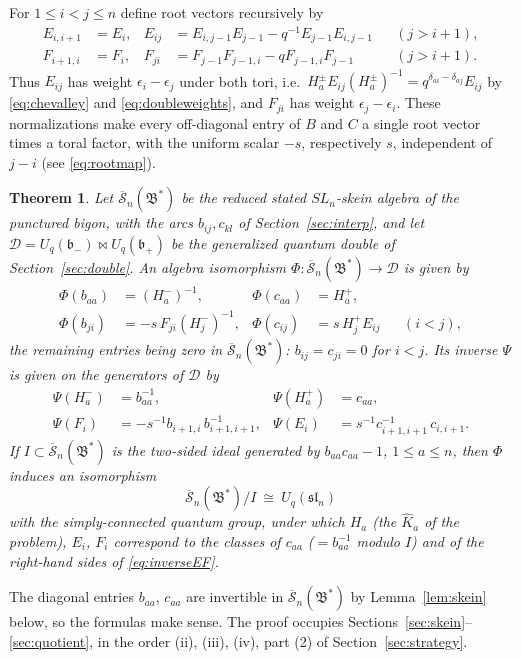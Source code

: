 \documentclass[11pt]{article}
\newtheorem{theorem}{Theorem}[section]
\theoremstyle{remark}
\newcommand{\U}{U_q}
\newcommand{\slN}{\mathfrak{sl}_n}
\newcommand{\bp}{\mathfrak b_+}
\newcommand{\bm}{\mathfrak b_-}
\newcommand{\redS}{\overline{\mathcal S}_n}
\newcommand{\Bstar}{\mathfrak B^*}
\newcommand{\cD}{\mathcal D}
\begin{document}
For $1\le i<j\le n$ define root vectors recursively by
\begin{align}
 E_{i,i+1}&=E_i,&
 E_{ij}&=E_{i,j-1}E_{j-1}-q^{-1}E_{j-1}E_{i,j-1}
                  &&(j>i+1), \label{eq:Eroots}\\
 F_{i+1,i}&=F_i,&
 F_{ji}&=F_{j-1}F_{j-1,i}-qF_{j-1,i}F_{j-1}
                  &&(j>i+1). \label{eq:Froots}
\end{align}
Thus $E_{ij}$ has weight $\epsilon_i-\epsilon_j$ under both tori, i.e.\
$H^\pm_aE_{ij}(H^\pm_a)^{-1}=q^{\delta_{ai}-\delta_{aj}}E_{ij}$ by
\eqref{eq:chevalley} and \eqref{eq:doubleweights}, and $F_{ji}$ has
weight $\epsilon_j-\epsilon_i$. These normalizations make every
off-diagonal entry of $B$ and $C$ a single root vector times a toral
factor, with the uniform scalar $-s$, respectively $s$, independent of
$j-i$ (see \eqref{eq:rootmap}).

\begin{theorem}\label{thm:main}
Let $\redS(\Bstar)$ be the reduced stated $SL_n$-skein algebra of the
punctured bigon, with the arcs $b_{ij},c_{kl}$ of
Section~\ref{sec:interp}, and let $\cD=\U(\bm)\bowtie\U(\bp)$ be the
generalized quantum double of Section~\ref{sec:double}. An algebra
isomorphism $\Phi:\redS(\Bstar)\to\cD$ is given by
\begin{align}
 \Phi(b_{aa})&=(H^-_a)^{-1},&
 \Phi(c_{aa})&=H^+_a, \label{eq:diagonalmap}\\
 \Phi(b_{ji})&=-s\,F_{ji}(H^-_j)^{-1},&
 \Phi(c_{ij})&=s\,H^+_jE_{ij}
                       &&(i<j), \label{eq:rootmap}
\end{align}
the remaining entries being zero in $\redS(\Bstar)$: $b_{ij}=c_{ji}=0$
for $i<j$. Its inverse $\Psi$ is given on the generators of $\cD$ by
\begin{align}
 \Psi(H^-_a)&=b_{aa}^{-1},&
 \Psi(H^+_a)&=c_{aa}, \label{eq:inverseH}\\
 \Psi(F_i)&=-s^{-1}b_{i+1,i}\,b_{i+1,i+1}^{-1},&
 \Psi(E_i)&=s^{-1}c_{i+1,i+1}^{-1}\,c_{i,i+1}. \label{eq:inverseEF}
\end{align}
If $I\subset\redS(\Bstar)$ is the two-sided ideal generated by
$b_{aa}c_{aa}-1$, $1\le a\le n$, then $\Phi$ induces an isomorphism
\[
 \redS(\Bstar)/I\ \cong\ \U(\slN)
\]
with the simply-connected quantum group, under which $H_a$ (the
$\hat K_a$ of the problem), $E_i$, $F_i$ correspond to the classes of
$c_{aa}$ ($=b_{aa}^{-1}$ modulo $I$) and of the right-hand sides of
\eqref{eq:inverseEF}.
\end{theorem}

The diagonal entries $b_{aa}$, $c_{aa}$ are invertible in
$\redS(\Bstar)$ by Lemma~\ref{lem:skein} below, so the formulas make
sense.
The proof occupies Sections~\ref{sec:skein}--\ref{sec:quotient}, in the
order (ii), (iii), (iv), part (2) of Section~\ref{sec:strategy}.
\end{document}

